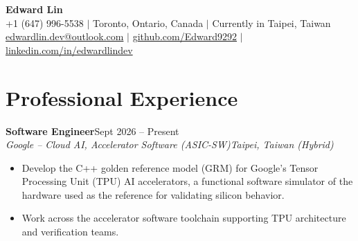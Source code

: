 \documentclass[10pt,letterpaper]{article}
\newcommand{\role}[4]{%
  \textbf{#1}\hfill #2\\
  \textit{#3}\hfill \textit{#4}\\[0.1em]
}
\begin{document}
\begin{center}
  {\LARGE\bfseries Edward Lin}\\[0.3em]
  +1 (647) 996-5538 $|$ Toronto, Ontario, Canada $|$ Currently in Taipei, Taiwan\\[0.25em]
  \href{mailto:edwardlin.dev@outlook.com}{edwardlin.dev@outlook.com} $|$
  \href{https://github.com/Edward9292}{github.com/Edward9292} $|$
  \href{https://www.linkedin.com/in/edwardlindev/}{linkedin.com/in/edwardlindev}
\end{center}

\section*{Professional Experience}

\role{Software Engineer}{Sept 2026 -- Present}{Google -- Cloud AI, Accelerator Software (ASIC-SW)}{Taipei, Taiwan (Hybrid)}
\begin{itemize}
  \item Develop the C++ golden reference model (GRM) for Google's Tensor Processing Unit (TPU) AI
        accelerators, a functional software simulator of the hardware used as the reference for
        validating silicon behavior.
  \item Work across the accelerator software toolchain supporting TPU architecture and verification teams.
\end{itemize}
\end{document}
